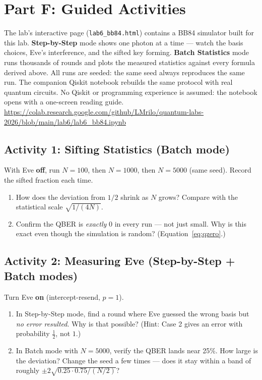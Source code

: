 \documentclass[a4paper,11pt]{article}
\begin{document}
\newpage

\section{Part F: Guided Activities}

\begin{simulatorbox}
The lab's interactive page (\texttt{lab6\_bb84.html}) contains a BB84 simulator
built for this lab. \textbf{Step-by-Step} mode shows one photon at a time --- watch
the basis choices, Eve's interference, and the sifted key forming.
\textbf{Batch Statistics} mode runs thousands of rounds and plots the measured
statistics against every formula derived above. All runs are seeded: the same seed
always reproduces the same run. The companion Qiskit notebook rebuilds the same
protocol with real quantum circuits. No Qiskit or programming experience is assumed:
the notebook opens with a one-screen reading guide.\\[4pt]
\url{https://colab.research.google.com/github/LMrilo/quantum-labs-2026/blob/main/lab6/lab6_bb84.ipynb}
\end{simulatorbox}

\subsection{Activity 1: Sifting Statistics (Batch mode)}

\begin{studentbox}
With Eve \textbf{off}, run $N = 100$, then $N = 1000$, then $N = 5000$ (same seed).
Record the sifted fraction each time.
\begin{enumerate}
    \item How does the deviation from $1/2$ shrink as $N$ grows? Compare with the
          statistical scale $\sqrt{1/(4N)}$.
    \item Confirm the QBER is \emph{exactly} 0 in every run --- not just small. Why
          is this exact even though the simulation is random?
          (Equation~\eqref{eq:qzero}.)
\end{enumerate}
\end{studentbox}

\subsection{Activity 2: Measuring Eve (Step-by-Step + Batch modes)}

\begin{studentbox}
Turn Eve \textbf{on} (intercept-resend, $p = 1$).
\begin{enumerate}
    \item In Step-by-Step mode, find a round where Eve guessed the wrong basis but
          \emph{no error resulted}. Why is that possible? (Hint: Case 2 gives an
          error with probability $\tfrac{1}{2}$, not $1$.)
    \item In Batch mode with $N = 5000$, verify the QBER lands near 25\%. How large
          is the deviation? Change the seed a few times --- does it stay within a
          band of roughly $\pm 2\sqrt{0.25 \cdot 0.75/(N/2)}$?
\end{enumerate}
\end{studentbox}
\end{document}
